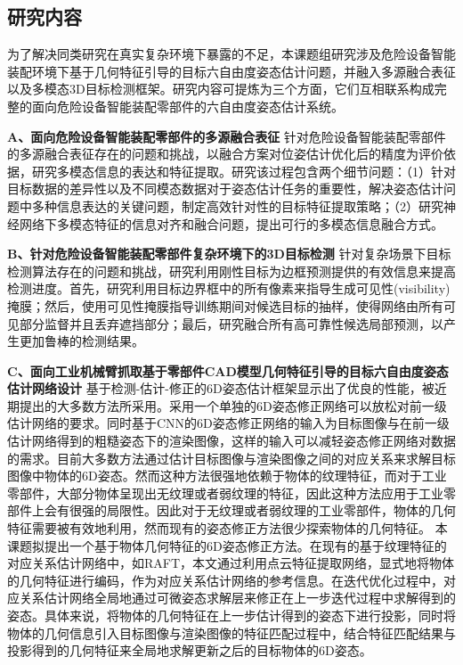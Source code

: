 \documentclass[12pt]{article}
\begin{document}



\subsection{研究内容}

为了解决同类研究在真实复杂环境下暴露的不足，本课题组研究涉及危险设备智能装配环境下基于几何特征引导的目标六自由度姿态估计问题，并融入多源融合表征以及多模态3D目标检测框架。研究内容可提炼为三个方面，它们互相联系构成完整的面向危险设备智能装配零部件的六自由度姿态估计系统。

\textbf{A、面向危险设备智能装配零部件的多源融合表征}
针对危险设备智能装配零部件的多源融合表征存在的问题和挑战，以融合方案对位姿估计优化后的精度为评价依据，研究多模态信息的表达和特征提取。研究该过程包含两个细节问题：（1）针对目标数据的差异性以及不同模态数据对于姿态估计任务的重要性，解决姿态估计问题中多种信息表达的关键问题，制定高效针对性的目标特征提取策略；（2）研究神经网络下多模态特征的信息对齐和融合问题，提出可行的多模态信息融合方式。

\textbf{B、针对危险设备智能装配零部件复杂环境下的3D目标检测}
针对复杂场景下目标检测算法存在的问题和挑战，研究利用刚性目标为边框预测提供的有效信息来提高检测进度。首先，研究利用目标边界框中的所有像素来指导生成可见性(visibility)掩膜；然后，使用可见性掩膜指导训练期间对候选目标的抽样，使得网络由所有可见部分监督并且丢弃遮挡部分；最后，研究融合所有高可靠性候选局部预测，以产生更加鲁棒的检测结果。

\textbf{C、面向工业机械臂抓取基于零部件CAD模型几何特征引导的目标六自由度姿态估计网络设计}
基于检测-估计-修正的6D姿态估计框架显示出了优良的性能，被近期提出的大多数方法所采用。采用一个单独的6D姿态修正网络可以放松对前一级估计网络的要求。同时基于CNN的6D姿态修正网络的输入为目标图像与在前一级估计网络得到的粗糙姿态下的渲染图像，这样的输入可以减轻姿态修正网络对数据的需求。目前大多数方法通过估计目标图像与渲染图像之间的对应关系来求解目标图像中物体的6D姿态。然而这种方法很强地依赖于物体的纹理特征，而对于工业零部件，大部分物体呈现出无纹理或者弱纹理的特征，因此这种方法应用于工业零部件上会有很强的局限性。因此对于无纹理或者弱纹理的工业零部件，物体的几何特征需要被有效地利用，然而现有的姿态修正方法很少探索物体的几何特征。
本课题拟提出一个基于物体几何特征的6D姿态修正方法。在现有的基于纹理特征的对应关系估计网络中，如RAFT，本文通过利用点云特征提取网络，显式地将物体的几何特征进行编码，作为对应关系估计网络的参考信息。在迭代优化过程中，对应关系估计网络全局地通过可微姿态求解层来修正在上一步迭代过程中求解得到的姿态。具体来说，将物体的几何特征在上一步估计得到的姿态下进行投影，同时将物体的几何信息引入目标图像与渲染图像的特征匹配过程中，结合特征匹配结果与投影得到的几何特征来全局地求解更新之后的目标物体的6D姿态。
\end{document}
